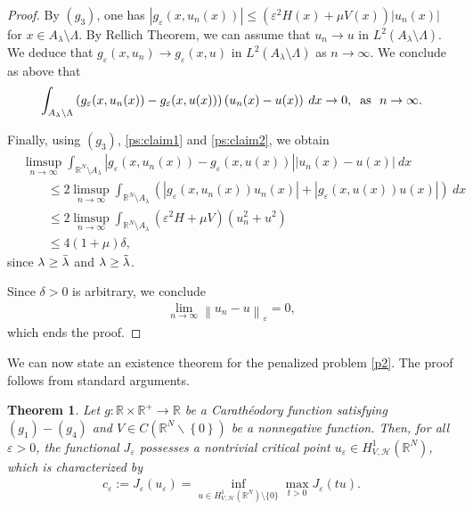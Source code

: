 \documentclass[a4paper]{amsart}
\newtheorem{theorem}{Theorem}
\begin{document}
\begin{proof}
By $(g_3)$, one has ${\left| {g_{\varepsilon}(x,u_n(x))} \right|} \leq \left( \varepsilon^2 H(x)+\mu V(x) \right) {\left| {u_n(x)} \right|}$ for $x \in
A_{\lambda}\setminus \Lambda$. By Rellich Theorem, we can assume that $u_n \rightarrow u$ in
$L^{2}(A_{\lambda}\setminus \Lambda)$. We deduce that $g_{\varepsilon}(x,u_n) \rightarrow g_{\varepsilon}(x,u)$ in
$L^2(A_{\lambda}\setminus \Lambda)$ as $n\to \infty$. We conclude as above that
\begin{align*}
 \int_{A_{\lambda}\setminus \Lambda} \left( g_{\varepsilon}(x,u_n(x))-g_{\varepsilon}(x,u(x)) \right)
\left(u_n(x)-u(x)\right)\: dx \rightarrow 0, \hspace{0.2cm} \text{as} \ \ n \rightarrow \infty.
\end{align*}

Finally, using $(g_3)$, \eqref{ps:claim1} and \eqref{ps:claim2}, we obtain
\begin{align*}
 &\limsup_{n \rightarrow \infty} \int_{{\mathbb{R}}^N\setminus A_{\lambda}} {\left| {g_{\varepsilon}(x,u_n(x))-g_{\varepsilon}(x,u(x))} \right|}
{\left| {u_n(x)-u(x)} \right|}\: dx \\ &\qquad \leq 2 \limsup_{n \rightarrow \infty} \int_{{\mathbb{R}}^N\setminus A_{\lambda}} \left(
{\left| {g_{\varepsilon}(x,u_n(x))u_n(x)} \right|} + {\left| {g_{\varepsilon}(x,u(x))u(x)} \right|} \right)\: dx \\
&\qquad \leq 2 \limsup_{n \rightarrow \infty} \int_{{\mathbb{R}}^N\setminus A_{\lambda}} \left( \varepsilon^2 H +\mu V  \right)
\left(u_n^2
+ u^2 \right) \\
&\qquad \leq 4(1+\mu) \delta,
\end{align*}
since $\lambda \geq \Bar{\lambda}$ and $\lambda \geq \Tilde{\lambda}$. 

Since $\delta > 0$ is arbitrary, we conclude
\begin{align*}
 \lim_{n \rightarrow \infty}{\left\| {u_n - u} \right\|}_{\varepsilon} = 0,
\end{align*}
which ends the proof.
\end{proof}

We can now state an existence theorem for the penalized problem \eqref{p2}. The proof follows from standard arguments.
\begin{theorem}\label{Th1}
 Let $g: {\mathbb{R}} \times {\mathbb{R}}^+ \rightarrow {\mathbb{R}}$ be a Carath\'eodory function satisfying $(g_1)-(g_4)$ and $V \in C({\mathbb{R}}^N \backslash
\left\{ 0 \right\})$ be a nonnegative function.
Then, for all $\varepsilon > 0$, the functional $J_{\varepsilon}$ possesses a nontrivial critical point $u_{\varepsilon} \in
H^1_{V,\mathcal{H}}({\mathbb{R}}^N)$, which is characterized by
\begin{align}\label{ceps}
 c_{\varepsilon} := J_{\varepsilon}(u_{\varepsilon}) = \inf_{u \in H^1_{V,\mathcal{H}}({\mathbb{R}}^N)\setminus \lbrace0\rbrace} \max_{t >
0} J_{\varepsilon}(tu).
\end{align}
\end{theorem}
\end{document}
